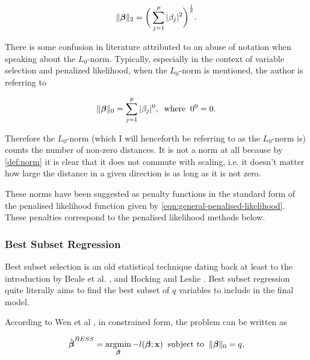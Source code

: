 \begin{definition}\label{def:euclidean-distance}
\begin{equation}\label{eqn:euclidean-distance}
    \Vert\boldsymbol{\beta}\Vert_2 = \bigg(\sum_{j=1}^p|\beta_j|^2\bigg)^{\frac{1}{2}}.
\end{equation}
\end{definition}

There is some confusion in literature attributed to an abuse of notation when speaking about the $L_0$-norm. Typically, especially in the context of variable selection and penalized likelihood, when the $L_0$-norm is mentioned, the author is referring to

\begin{equation}
    \Vert\boldsymbol{\beta}\Vert_0 =\sum_{j=1}^p|\beta_j|^0,\;\;\textrm{where}\;\;0^0=0.
\end{equation}

Therefore the $L_0$-norm (which I will henceforth be referring to as the $L_0$-norm is) counts the number of non-zero distances. It is not a norm at all because by \cref{def:norm} it is clear that it does not commute with scaling, i.e. it doesn't matter how large the distance in a given direction is as long as it is not zero.

These norms have been suggested as penalty functions in the standard form of the penalised likelihood function given by \cref{eqn:general-penalised-likelihood}. These penalties correspond to the penalised likelihood methods below.

\subsubsection{Best Subset Regression}\label{sec:best-subset-regression}

Best subset selection is an old statistical technique dating back at least to the introduction by Beale et al. , and Hocking and Leslie . Best subset regression quite literally aims to find the best subset of $q$ variables to include in the final model.

According to Wen et al , in constrained form, the problem can be written as

\begin{equation}
    \hat{\boldsymbol{\beta}}^{BESS}=\operatorname*{argmin}_{\boldsymbol{\beta}} -l(\boldsymbol{\beta};\textbf{x})\;\;\textrm{subject to}\;\;\Vert\boldsymbol{\beta}\Vert_0=q,
\end{equation}

